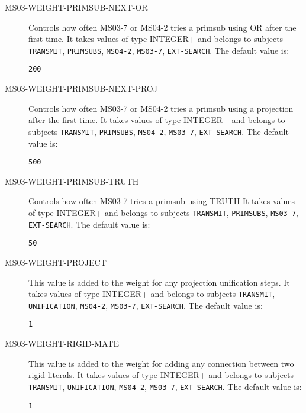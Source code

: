 \begin{description}
\item[MS03-WEIGHT-PRIMSUB-NEXT-OR]  
Controls how often MS03-7 or MS04-2 tries a primsub using OR after the first time.
It takes values of type INTEGER+ and belongs to subjects \texttt{TRANSMIT}, \texttt{PRIMSUBS}, \texttt{MS04-2}, \texttt{MS03-7}, \texttt{EXT-SEARCH}.  The default value is: \begin{lstlisting}
200
\end{lstlisting}

\item[MS03-WEIGHT-PRIMSUB-NEXT-PROJ]  
Controls how often MS03-7 or MS04-2 tries a primsub using a projection after the first time.
It takes values of type INTEGER+ and belongs to subjects \texttt{TRANSMIT}, \texttt{PRIMSUBS}, \texttt{MS04-2}, \texttt{MS03-7}, \texttt{EXT-SEARCH}.  The default value is: \begin{lstlisting}
500
\end{lstlisting}

\item[MS03-WEIGHT-PRIMSUB-TRUTH]  
Controls how often MS03-7 tries a primsub using TRUTH
It takes values of type INTEGER+ and belongs to subjects \texttt{TRANSMIT}, \texttt{PRIMSUBS}, \texttt{MS03-7}, \texttt{EXT-SEARCH}.  The default value is: \begin{lstlisting}
50
\end{lstlisting}

\item[MS03-WEIGHT-PROJECT]  
This value is added to the weight for any projection unification steps.
It takes values of type INTEGER+ and belongs to subjects \texttt{TRANSMIT}, \texttt{UNIFICATION}, \texttt{MS04-2}, \texttt{MS03-7}, \texttt{EXT-SEARCH}.  The default value is: \begin{lstlisting}
1
\end{lstlisting}

\item[MS03-WEIGHT-RIGID-MATE]  
This value is added to the weight for adding any connection between
two rigid literals.
It takes values of type INTEGER+ and belongs to subjects \texttt{TRANSMIT}, \texttt{UNIFICATION}, \texttt{MS04-2}, \texttt{MS03-7}, \texttt{EXT-SEARCH}.  The default value is: \begin{lstlisting}
1
\end{lstlisting}


\end{description}
